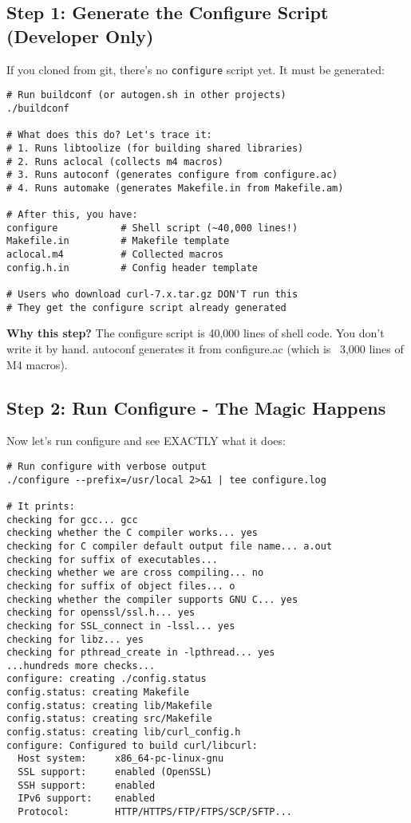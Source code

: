 \subsection{Step 1: Generate the Configure Script (Developer Only)}

If you cloned from git, there's no \texttt{configure} script yet. It must be generated:

\begin{lstlisting}
# Run buildconf (or autogen.sh in other projects)
./buildconf

# What does this do? Let's trace it:
# 1. Runs libtoolize (for building shared libraries)
# 2. Runs aclocal (collects m4 macros)
# 3. Runs autoconf (generates configure from configure.ac)
# 4. Runs automake (generates Makefile.in from Makefile.am)

# After this, you have:
configure           # Shell script (~40,000 lines!)
Makefile.in         # Makefile template
aclocal.m4          # Collected macros
config.h.in         # Config header template

# Users who download curl-7.x.tar.gz DON'T run this
# They get the configure script already generated
\end{lstlisting}

\textbf{Why this step?} The configure script is 40,000 lines of shell code. You don't write it by hand. autoconf generates it from configure.ac (which is ~3,000 lines of M4 macros).

\subsection{Step 2: Run Configure - The Magic Happens}

Now let's run configure and see EXACTLY what it does:

\begin{lstlisting}
# Run configure with verbose output
./configure --prefix=/usr/local 2>&1 | tee configure.log

# It prints:
checking for gcc... gcc
checking whether the C compiler works... yes
checking for C compiler default output file name... a.out
checking for suffix of executables...
checking whether we are cross compiling... no
checking for suffix of object files... o
checking whether the compiler supports GNU C... yes
checking for openssl/ssl.h... yes
checking for SSL_connect in -lssl... yes
checking for libz... yes
checking for pthread_create in -lpthread... yes
...hundreds more checks...
configure: creating ./config.status
config.status: creating Makefile
config.status: creating lib/Makefile
config.status: creating src/Makefile
config.status: creating lib/curl_config.h
configure: Configured to build curl/libcurl:
  Host system:     x86_64-pc-linux-gnu
  SSL support:     enabled (OpenSSL)
  SSH support:     enabled
  IPv6 support:    enabled
  Protocol:        HTTP/HTTPS/FTP/FTPS/SCP/SFTP...
\end{lstlisting}

